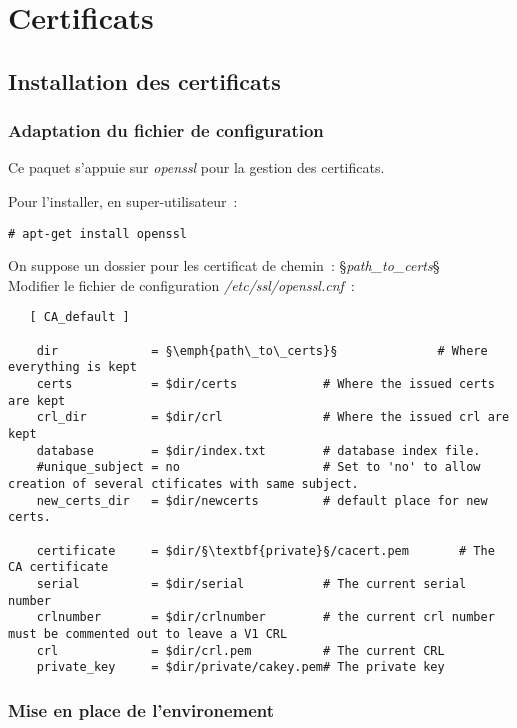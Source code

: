 \section{Certificats}
\subsection{Installation des certificats}
\subsubsection{Adaptation du fichier de configuration}

Ce paquet s'appuie sur \emph{openssl} pour la gestion des certificats.

Pour l'installer, en super-utilisateur~:

\begin{lstlisting}
# apt-get install openssl
\end{lstlisting}

On suppose un dossier pour les certificat de chemin~: §\emph{path\_to\_certs}§\\

Modifier le fichier de configuration \emph{/etc/ssl/openssl.cnf}~:

\begin{lstlisting}
   [ CA_default ]

    dir             = §\emph{path\_to\_certs}§              # Where everything is kept
    certs           = $dir/certs            # Where the issued certs are kept
    crl_dir         = $dir/crl              # Where the issued crl are kept
    database        = $dir/index.txt        # database index file.
    #unique_subject = no                    # Set to 'no' to allow creation of several ctificates with same subject.
    new_certs_dir   = $dir/newcerts         # default place for new certs.

    certificate     = $dir/§\textbf{private}§/cacert.pem       # The CA certificate
    serial          = $dir/serial           # The current serial number
    crlnumber       = $dir/crlnumber        # the current crl number must be commented out to leave a V1 CRL
    crl             = $dir/crl.pem          # The current CRL
    private_key     = $dir/private/cakey.pem# The private key
\end{lstlisting}

\subsubsection{Mise en place de l'environement}

